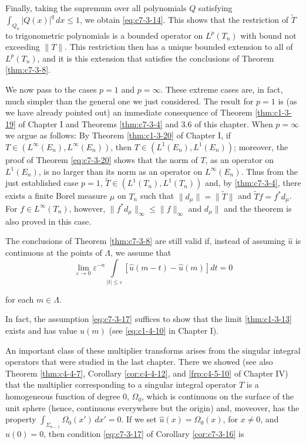 Finally, taking the supremum over all polynomials $Q$ satisfying $\int_{Q_n}|Q(x)|^q \, dx \leq 1$, we obtain \eqref{eq:c7-3-14}. This shows that the restriction of $\tilde{T}$ to trigonometric polynomials is a bounded operator on $L^p(T_n)$ with bound not exceeding $\|T\|$. This restriction then has a unique bounded extension to all of $L^p(T_n)$, and it is this extension that satisfies the conclusions of Theorem \ref{thm:c7-3-8}.

We now pass to the cases $p = 1$ and $p = \infty$. These extreme cases are, in fact, much simpler than the general one we just considered. The result for $p = 1$ is (as we have already pointed out) an immediate consequence of Theorem \ref{thm:c1-3-19} of Chapter I and Theorems \ref{thm:c7-3-4} and 3.6 of this chapter. When $p = \infty$ we argue as follows: By Theorem \ref{thm:c1-3-20} of Chapter I, if $T \in (L^\infty(E_n), L^\infty(E_n))$, then $T \in (L^1(E_n), L^1(E_n))$; moreover, the proof of Theorem \ref{eq:c7-3-20} shows that the norm of $T$, as an operator on $L^1(E_n)$, is no larger than its norm as an operator on $L^\infty(E_n)$. Thus from the just established case $p = 1$, $\widetilde{T} \in (L^1(T_n), L^1(T_n))$ and, by \eqref{thm:c7-3-4}, there exists a finite Borel measure $\mu$ on $T_n$ such that $\|d_\mu\| = \|\widetilde{T}\|$ and $\widetilde{T}f = f^* d_\mu$. For $f \in L^\infty(T_n)$, however, $\|f^* d_\mu\|_\infty \leq \|f\|_\infty$ and $d_\mu\|$ and the theorem is also proved in this case.

\begin{corollary}
\label{cor:c7-3-16}
The conclusions of Theorem \ref{thm:c7-3-8} are still valid if, instead of assuming $\hat{u}$ is continuous at the points of $\Lambda$, we assume that
\begin{equation}\label{eq:c7-3-17}
\lim_{\varepsilon\to0}\varepsilon^{-n}\int\limits_{|t|\leq\varepsilon}\left[\hat{u}(m-t)-\hat{u}(m)\right]d t=0
\end{equation}

for each $m \in \Lambda$.
\end{corollary}

In fact, the assumption \eqref{eq:c7-3-17} suffices to show that the limit \eqref{thm:c1-3-13} exists and has value $\hat{u}(m)$ (see \eqref{eq:c1-4-10} in Chapter I).

An important class of these multiplier transforms arises from the singular integral operators that were studied in the last chapter. There we showed (see also Theorem \ref{thm:c4-4-7}, Corollary \ref{cor:c4-4-12}, and \eqref{frp:c4-5-10} of Chapter IV) that the multiplier corresponding to a singular integral operator $T$ is a homogeneous function of degree 0, $\Omega_0$, which is continuous on the surface of the unit sphere (hence, continuous everywhere but the origin) and, moveover, has the property $\int_{\Sigma_{n-1}} \Omega_0(x') \, dx' = 0$. If we set $\hat{u}(x) = \Omega_0(x)$, for $x \neq 0$, and $\hat{u}(0) = 0$, then condition \eqref{eq:c7-3-17} of Corollary \ref{cor:c7-3-16} is

